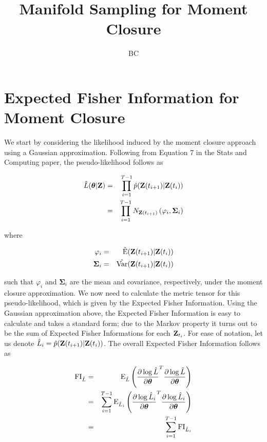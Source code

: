 \documentclass[11pt]{amsart}
\title{Manifold Sampling for Moment Closure}
\author{BC}
\begin{document}
\maketitle

\section{Expected Fisher Information for Moment Closure}

We start by considering the likelihood induced by the moment closure approach using a Gaussian approximation.  Following from Equation 7 in the Stats and Computing paper, the pseudo-likelihood follows as

\begin{eqnarray}
\hat{L}( \boldsymbol\theta | {\bf Z} ) &=& \prod_{i=1}^{T-1} \hat{p}( {\bf Z}(t_{i+1}) | {\bf Z}(t_i) ) \notag \\
&=& \prod_{i=1}^{T-1} {N}_{ {\bf Z}(t_{i+1}) } \left( \varphi_i, \boldsymbol\Sigma_{i} \right)
\end{eqnarray}

\noindent where

\begin{eqnarray}
\varphi_i &=& \hat{\text{E}}( {\bf Z}(t_{i+1}) | {\bf Z}(t_i) ) \\
\boldsymbol\Sigma_i &=& \hat{\text{Var}} ( {\bf Z}(t_{i+1}) | {\bf Z}(t_i) )
\end{eqnarray}

\noindent such that $\varphi_i$ and $\boldsymbol\Sigma_i$ are the mean and covariance, respectively, under the moment closure approximation.  We now need to calculate the metric tensor for this pseudo-likelihood, which is given by the Expected Fisher Information.  Using the Gaussian approximation above, the Expected Fisher Information is easy to calculate and takes a standard form; due to the Markov property it turns out to be the sum of Expected Fisher Informations for each ${\bf Z}_{t_i}$.  For ease of notation, let us denote $\hat{L}_i = \hat{p}( {\bf Z}(t_{i+1}) | {\bf Z}(t_i) )$.  The overall Expected Fisher Information follows as

\begin{eqnarray}
\text{FI}_{\hat{L}} &=& \text{E}_{\hat{L}} \left( \frac{\partial \log \hat{L}}{\partial\boldsymbol\theta}^T \frac{\partial \log \hat{L}}{\partial\boldsymbol\theta} \right) \notag\\
&=& \sum_{i=1}^{T-1} \text{E}_{\hat{L}_i} \left( \frac{\partial \log \hat{L}_i}{\partial\boldsymbol\theta}^T \frac{\partial \log \hat{L}_i}{\partial\boldsymbol\theta} \right)\\
&=& \sum_{i=1}^{T-1} \text{FI}_{\hat{L}_i}
\end{eqnarray}
\end{document}
